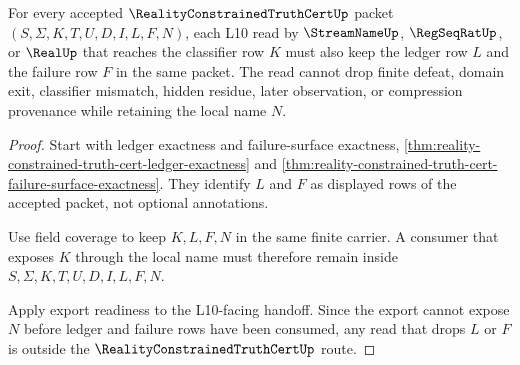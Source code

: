 \begin{theorem}
\label{thm:reality-constrained-truth-cert-l10-failure-ledger-lock}
For every accepted $\RealityConstrainedTruthCertUp$ packet
$(S,\Sigma,K,T,U,D,I,L,F,N)$, each L10 read by $\StreamNameUp$,
$\RegSeqRatUp$, or $\RealUp$ that reaches the classifier row $K$ must also keep
the ledger row $L$ and the failure row $F$ in the same packet. The read cannot
drop finite defeat, domain exit, classifier mismatch, hidden residue, later
observation, or compression provenance while retaining the local name $N$.
\end{theorem}
\begin{proof}
Start with ledger exactness and failure-surface exactness,
\autoref{thm:reality-constrained-truth-cert-ledger-exactness} and
\autoref{thm:reality-constrained-truth-cert-failure-surface-exactness}. They
identify $L$ and $F$ as displayed rows of the accepted packet, not optional
annotations.

Use field coverage to keep $K,L,F,N$ in the same finite carrier. A consumer
that exposes $K$ through the local name must therefore remain inside
$S,\Sigma,K,T,U,D,I,L,F,N$.

Apply export readiness to the L10-facing handoff. Since the export cannot
expose $N$ before ledger and failure rows have been consumed, any read that
drops $L$ or $F$ is outside the $\RealityConstrainedTruthCertUp$ route.
\end{proof}

